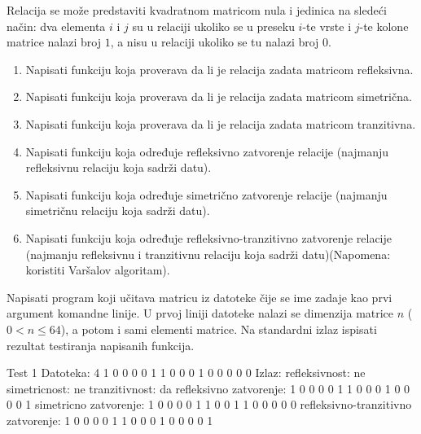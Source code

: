 \begin{Exercise}[label=322]
Relacija se može predstaviti kvadratnom matricom nula i
jedinica na sledeći način: dva elementa $i$ i $j$
su u relaciji ukoliko se u preseku $i$-te vrste i $j$-te
kolone matrice nalazi broj $1$, a nisu u relaciji ukoliko se
tu nalazi broj $0$. 
\begin{enumerate}
\item Napisati funkciju koja proverava da li je relacija zadata matricom refleksivna.
\item Napisati funkciju koja proverava da li je relacija zadata matricom simetrična.
\item Napisati funkciju koja proverava da li je relacija zadata matricom tranzitivna.
\item Napisati funkciju koja određuje refleksivno zatvorenje relacije (najmanju refleksivnu relaciju koja sadrži datu).
\item Napisati funkciju koja određuje simetrično zatvorenje relacije (najmanju simetričnu relaciju koja sadrži datu).
\item Napisati funkciju koja određuje refleksivno-tranzitivno zatvorenje relacije (najmanju refleksivnu i tranzitivnu relaciju
koja sadrži datu)(Napomena: koristiti Varšalov algoritam).
\end{enumerate}
Napisati program koji učitava matricu iz datoteke čije se ime zadaje kao prvi argument komandne linije.
U prvoj liniji datoteke nalazi se dimenzija matrice $n$ ($0<n\leq 64$), a potom i sami elementi matrice.
Na standardni izlaz ispisati rezultat testiranja napisanih funkcija.

\begin{maxitest}
\begin{test}{Test 1}
Datoteka:  4
           1 0 0 0
           0 1 1 0
           0 0 1 0
           0 0 0 0
Izlaz:     refleksivnost: ne
           simetricnost: ne
           tranzitivnost: da
           refleksivno zatvorenje:
           1 0 0 0
           0 1 1 0
           0 0 1 0
           0 0 0 1
           simetricno zatvorenje:
           1 0 0 0
           0 1 1 0
           0 1 1 0
           0 0 0 0
           refleksivno-tranzitivno zatvorenje:
           1 0 0 0
           0 1 1 0
           0 0 1 0
           0 0 0 1
\end{test}
\end{maxitest}
\end{Exercise}
\begin{Answer}[ref=322]
\end{Answer}

